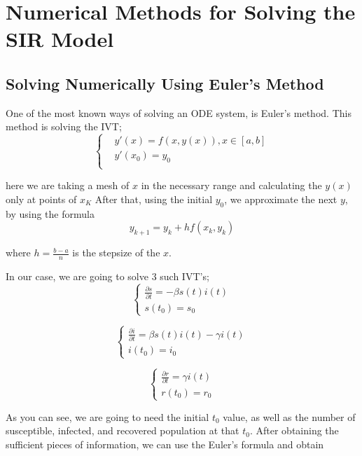\section{Numerical Methods for Solving the SIR Model}\label{Numerical_Methods}\thispagestyle{SectionFirstPage} %
\subsection{Solving Numerically Using Euler's Method}\label{multicollinearity}
\hspace{\parindent} One of the most known ways of solving an ODE system, is Euler's method. This method is solving the IVT;
\begin{equation}
	\left\{\begin{aligned}
		& y'(x) = f(x,y(x)), x \in [a,b] \\
		& y'(x_0)=y_0 \\
	\end{aligned}
\end{equation}

\par here we are taking a mesh of $x$ in the necessary range and calculating the $y(x)$ only at points of $x_K$
After that, using the initial $y_0$, we approximate the next $y$, by using the formula
\begin{equation}
	y_{k+1} = y_k + h f(x_k,y_k)
\end{equation}
\par where $h=\frac{b-a}{n}$ is the stepsize of the $x$.
\par In our case, we are going to solve 3 such IVT's;
\[
	\left\{
		\begin{array}{l}
			\frac{\partial s}{\partial t} = -\beta s(t)  i(t)  \\
			s(t_0)=s_0
		\end{array}
	\right.
\]

\[
	\left\{
		\begin{array}{l}
			\frac{\partial i}{\partial t} = \beta s(t)  i(t) - \gamma i(t) \\
			i(t_0)=i_0
		\end{array}
	\right.
\]

\[
	\left\{
		\begin{array}{l}
			\frac{\partial r}{\partial t} = \gamma i(t) \\
			r(t_0)=r_0
		\end{array}
	\right.
\]

\par As you can see, we are going to need the initial $t_0$ value, as well as the number
of susceptible, infected, and recovered population at that $t_0$.
After obtaining the sufficient pieces of information, we can use the Euler's formula and obtain

